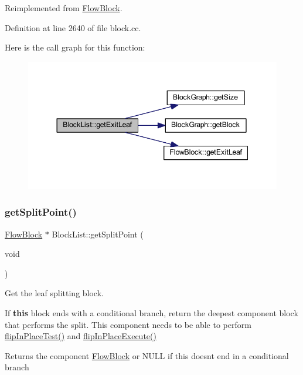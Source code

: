 Reimplemented from \mbox{\hyperlink{class_flow_block_a611bb926194635a0f5cfc0eb16cabe6a}{Flow\+Block}}.



Definition at line 2640 of file block.\+cc.

Here is the call graph for this function\+:
\nopagebreak
\begin{figure}[H]
\begin{center}
\leavevmode
\includegraphics[width=344pt]{class_block_list_afa30fcb7c819884d7bbfe07548b4253d_cgraph}
\end{center}
\end{figure}
\mbox{\label{class_block_list_a18e5d3b6de59ea0522dfb1eb96c012c6}} 
\subsubsection{\texorpdfstring{getSplitPoint()}{getSplitPoint()}}
{\footnotesize\ttfamily \mbox{\hyperlink{class_flow_block}{Flow\+Block}} $\ast$ Block\+List\+::get\+Split\+Point (\begin{DoxyParamCaption}\item[{void}]{ }\end{DoxyParamCaption})\hspace{0.3cm}{\ttfamily [virtual]}}



Get the leaf splitting block. 

If {\bfseries{this}} block ends with a conditional branch, return the deepest component block that performs the split. This component needs to be able to perform \mbox{\hyperlink{class_flow_block_a09019e2e4104844e1a698ccf72560bef}{flip\+In\+Place\+Test()}} and \mbox{\hyperlink{class_flow_block_a263ec50d30f807a8e1286ac37c6728ce}{flip\+In\+Place\+Execute()}} \begin{DoxyReturn}{Returns}
the component \mbox{\hyperlink{class_flow_block}{Flow\+Block}} or N\+U\+LL if this doesn\textquotesingle{}t end in a conditional branch 
\end{DoxyReturn}


